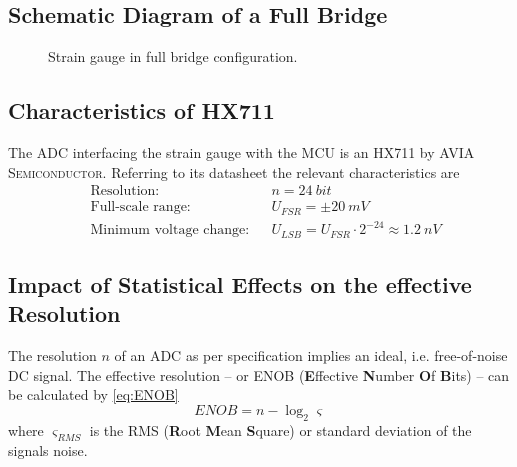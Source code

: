         \subsection{Schematic Diagram of a Full Bridge}\label{sec:A5 schematic diagram full bridge}%
            \begin{figure}[H]
                \centering
                
                \caption[Strain gauge in full bridge configuration]{Strain gauge in full bridge configuration.}
                \label{fig:strain gauge full bridge}
            \end{figure}
        \subsection{Characteristics of HX711}\label{sec:A6 characteristics of the HX711}%
            The ADC interfacing the strain gauge with the MCU is an HX711 by \textsc{AVIA Semiconductor}. Referring to its
            datasheet \cite{HX711.24bit.ADC.2021} the relevant characteristics are
            \begin{align}
                &\text{Resolution:}             &&n = \SI{24}{bit}\\
                &\text{Full-scale range:}       &&U_{FSR} = \pm \SI{20}{mV}\\
                &\text{Minimum voltage change:} &&U_{LSB} = U_{FSR} \cdot 2^{-24} \approx \SI{1.2}{nV}
            \end{align}
        \subsection{Impact of Statistical Effects on the effective Resolution}\label{sec:A7 statistical effects}%
            The resolution \( n \) of an ADC as per specification implies an ideal, i.e. free-of-noise DC signal. The effective resolution --
            or ENOB (\textbf{E}ffective \textbf{N}umber \textbf{O}f \textbf{B}its) -- can be calculated by \cref{eq:ENOB}
            \begin{equation}
                ENOB = n - \log_2{\varsigma}
                \label{eq:ENOB}
            \end{equation}
            where \( \varsigma_{RMS} \) is the RMS (\textbf{R}oot \textbf{M}ean \textbf{S}quare) or standard deviation of the signals noise.

